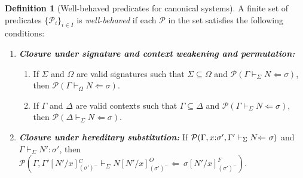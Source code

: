 \documentclass[submission,copyright,creativecommons]{eptcs}
\theoremstyle{plain}
\theoremstyle{definition}
\newtheorem{definition}{Definition}[section]
\newcommand {\VDASHS} {\vdash_\Sigma} \newcommand {\VDASHO} {\vdash_\Omega} \newcommand {\VDASHCBV} {\vdash_{\Sigma_{{CBV}}}} \newcommand {\VDASHSIMP} {\vdash_{\Sigma_{{Imp}}}} \newcommand {\VDASHSHOARE} {\vdash_{\Sigma_{{Hoare}}}} \newcommand {\VDASHSERASE} {\vdash_{\Sigma^\Erase}}    \newcommand {\VDASHEAL} {\vdash_{EAL}} \newcommand {\VDASHSEAL} {\vdash_{\Sigma_{{EAL}}}} \newcommand {\VDASHFP} {\vdash_{\sf FPST}}
\renewcommand {\P} {\mathcal{P}} \newcommand {\Q} {\mathcal{Q}}
\renewcommand {\L} {\mathcal{L}} \newcommand   {\C} {\mathcal{C}} \newcommand   {\T} {\mathcal{T}} \newcommand   {\U} {\mathcal{U}}
\newcommand{\Erase} {{-\U\L}}
\begin{document}
\begin{definition}[Well-behaved predicates for canonical systems]
  \label{def:wbred}
  A finite set of predicates $\{ \P_i\}_{i\in I}$ is
  \emph{well-behaved} if each $\P$ in the set satisfies the following
  conditions:

  \begin{enumerate}
    \setlength\itemsep{-0.3ex}
  \item {\bf \emph{Closure under signature and context weakening and
        permutation:}}\vspace{-0.5ex}
    \begin{enumerate}
      \setlength\itemsep{-0.3ex}
    \item If $\Sigma$ and $\Omega$ are valid signatures such that
      $\Sigma \subseteq \Omega$ and
      $\P(\Gamma \VDASHS N\Leftarrow\sigma)$, then $\P(\Gamma \VDASHO N\Leftarrow\sigma)$. \item If $\Gamma$ and $\Delta$ are valid contexts such that
      $\Gamma\subseteq \Delta$ and
      $\P(\Gamma \VDASHS N\Leftarrow\sigma)$, then \mbox{$\P(\Delta \VDASHS
        N\Leftarrow\sigma)$.} \end{enumerate}
  \item{\bf \emph{Closure under {hereditary} substitution:}} If
    $\P(\Gamma, x \of \sigma', \Gamma' \VDASHS N {\Leftarrow}\
    \sigma)$ and $\Gamma \VDASHS N' : \sigma'$, then\\
    $\P(\Gamma, \Gamma'[N'/x]{^C_{(\sigma')^-}} \VDASHS N
    [N'/x]^O_{(\sigma')^-} {\Leftarrow}\
    \sigma[N'/x]^F_{(\sigma')^-})$.
  \end{enumerate}
\end{definition}
\end{document}
